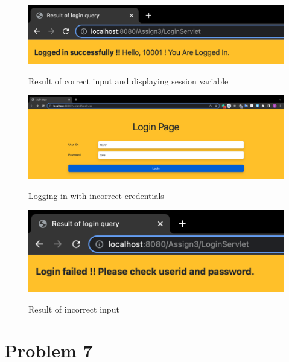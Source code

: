 \documentclass[12pt]{article}
\begin{document}
\begin{figure}[!hbt]
    \centering
    \includegraphics[scale=0.75]{screenshots/4.png}
    \label{fig:my_label1}
    \caption{Result of correct input and displaying session variable}
\end{figure}

\newpage

\begin{figure}[!hbt]
    \centering
    \includegraphics[scale=0.35]{screenshots/5.png}
    \label{fig:my_label1}
    \caption{Logging in with incorrect credentials}
\end{figure}

\vspace{2cm} 

\begin{figure}[!hbt]
    \centering
    \includegraphics[scale=0.75]{screenshots/6.png}
    \label{fig:my_label1}
    \caption{Result of incorrect input}
\end{figure}

\newpage

\section{Problem 7}
\end{document}
